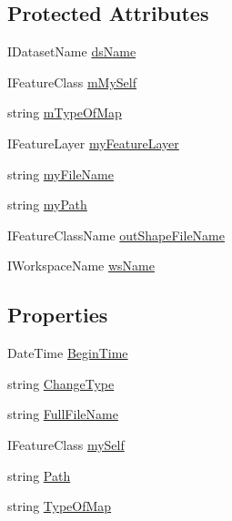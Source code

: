 \subsection*{Protected Attributes}
\begin{DoxyCompactItemize}
\item 
I\-Dataset\-Name \hyperlink{class_s_e_a_r_c_h_1_1_map_a7574d4bb88c0b061549c9dece3001a23}{ds\-Name}
\item 
I\-Feature\-Class \hyperlink{class_s_e_a_r_c_h_1_1_map_af2222aba365913cbc5c4b2079548c239}{m\-My\-Self}
\item 
string \hyperlink{class_s_e_a_r_c_h_1_1_map_a90d4766a33cf7449b2c8718444529f57}{m\-Type\-Of\-Map}
\item 
I\-Feature\-Layer \hyperlink{class_s_e_a_r_c_h_1_1_map_a9e7228cbe13122db7eaaab6b9d082ee7}{my\-Feature\-Layer}
\item 
string \hyperlink{class_s_e_a_r_c_h_1_1_map_a28f79b85291e056fc85ca8323da61297}{my\-File\-Name}
\item 
string \hyperlink{class_s_e_a_r_c_h_1_1_map_a0f0c4abf19365d8718c41e73deb2aa09}{my\-Path}
\item 
I\-Feature\-Class\-Name \hyperlink{class_s_e_a_r_c_h_1_1_map_a082cc6a38d780c1297092f10539e4cfc}{out\-Shape\-File\-Name}
\item 
I\-Workspace\-Name \hyperlink{class_s_e_a_r_c_h_1_1_map_afe1df1bff77c399788491856548bb3cd}{ws\-Name}
\end{DoxyCompactItemize}
\subsection*{Properties}
\begin{DoxyCompactItemize}
\item 
Date\-Time \hyperlink{class_s_e_a_r_c_h_1_1_map_a4e32fd0cba61fd31d31b23d637a6fdc6}{Begin\-Time}
\item 
string \hyperlink{class_s_e_a_r_c_h_1_1_map_a25648ab34ea64af19851858a4a4dbebe}{Change\-Type}
\item 
string \hyperlink{class_s_e_a_r_c_h_1_1_map_a7905b479d4c635fef8133212ec532e3f}{Full\-File\-Name}
\item 
I\-Feature\-Class \hyperlink{class_s_e_a_r_c_h_1_1_map_a6bb03e540f47336a0eac62a1b73e8cfe}{my\-Self}
\item 
string \hyperlink{class_s_e_a_r_c_h_1_1_map_a64d3d4785e808bbc15781d2071ff8c3e}{Path}
\item 
string \hyperlink{class_s_e_a_r_c_h_1_1_map_afa651b1a6b9cc662d4c5b40513cf6906}{Type\-Of\-Map}
\end{DoxyCompactItemize}


